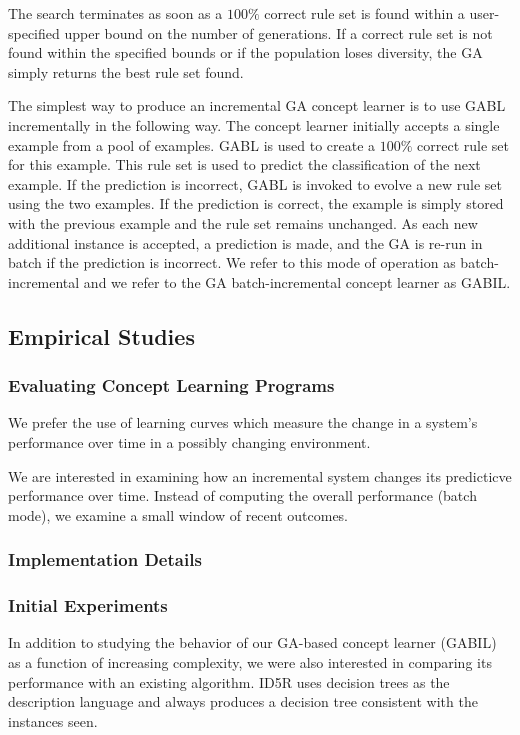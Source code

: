\documentclass[12pt]{article}
\begin{document}
The search terminates as soon as a $100\%$ correct rule set is found within a user-specified upper bound on the number of generations. If a correct rule set is not found within the specified bounds or if the population loses diversity, the GA simply returns the best rule set found.

The simplest way to produce an incremental GA concept learner is to use GABL incrementally in the following way. The concept learner initially accepts a single example from a pool of examples. GABL is used to create a $100\%$ correct rule set for this example. This rule set is used to predict the classification of the next example. If the prediction is incorrect, GABL is invoked to evolve a new rule set using the two examples. If the prediction is correct, the example is simply stored with the previous example and the rule set remains unchanged. As each new additional instance is accepted, a prediction is made, and the GA is re-run in batch if the prediction is incorrect. We refer to this mode of operation as batch-incremental and we refer to the GA batch-incremental concept learner as GABIL.

\subsection{Empirical Studies}
\subsubsection{Evaluating Concept Learning Programs}
We prefer the use of learning curves which measure the change in a system's performance over time in a possibly changing environment.

We are interested in examining how an incremental system changes its predicticve performance over time. Instead of computing the overall performance (batch mode), we examine a small window of recent outcomes.

\subsubsection{Implementation Details}

\subsubsection{Initial Experiments}
In addition to studying the behavior of our GA-based concept learner (GABIL) as a function of increasing complexity, we were also interested in comparing its performance with an existing algorithm. ID5R uses decision trees as the description language and always produces a decision tree consistent with the instances seen.
\end{document}
